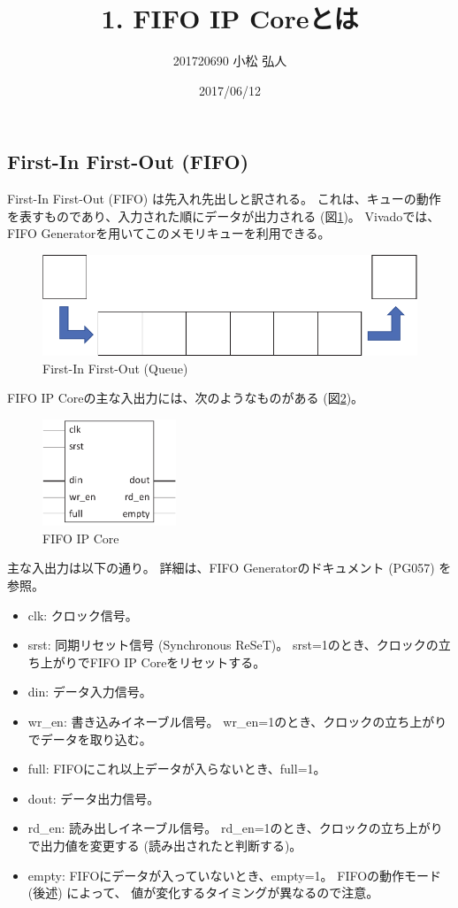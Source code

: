 \documentclass[11pt]{jsarticle}
\title{1. FIFO IP Coreとは}
\author{201720690 小松 弘人}
\date{2017/06/12}
\begin{document}
\maketitle
\subsection*{First-In First-Out (FIFO)}

First-In First-Out (FIFO) は先入れ先出しと訳される。
これは、キューの動作を表すものであり、入力された順にデータが出力される
(図\ref{img:queue})。
Vivadoでは、FIFO Generatorを用いてこのメモリキューを利用できる。

\begin{figure}[ht]
	\centering
	\includegraphics[width=0.6\linewidth]{img/queue.pdf}
	\caption{First-In First-Out (Queue)}
	\label{img:queue}
\end{figure}

\vspace{-0.3cm}

FIFO IP Coreの主な入出力には、次のようなものがある (図\ref{img:fifo_ip})。
\begin{figure}[ht]
	\centering
	\includegraphics[width=4cm]{img/fifo_ip.pdf}
	\caption{FIFO IP Core}
	\label{img:fifo_ip}
\end{figure}

\vspace{-0.3cm}

主な入出力は以下の通り。
詳細は、FIFO Generatorのドキュメント (PG057) を参照。
\begin{itemize}
	\item
		clk:
		クロック信号。
	\item
		srst:
		同期リセット信号 (Synchronous ReSeT)。
		srst=1のとき、クロックの立ち上がりでFIFO IP Coreをリセットする。
	\item
		din:
		データ入力信号。
	\item
		wr\_en:
		書き込みイネーブル信号。
		wr\_en=1のとき、クロックの立ち上がりでデータを取り込む。
	\item
		full:
		FIFOにこれ以上データが入らないとき、full=1。
	\item
		dout:
		データ出力信号。
	\item
		rd\_en:
		読み出しイネーブル信号。
		rd\_en=1のとき、クロックの立ち上がりで出力値を変更する
		(読み出されたと判断する)。
	\item
		empty:
		FIFOにデータが入っていないとき、empty=1。
		FIFOの動作モード (後述) によって、
		値が変化するタイミングが異なるので注意。
\end{itemize}
\end{document}
